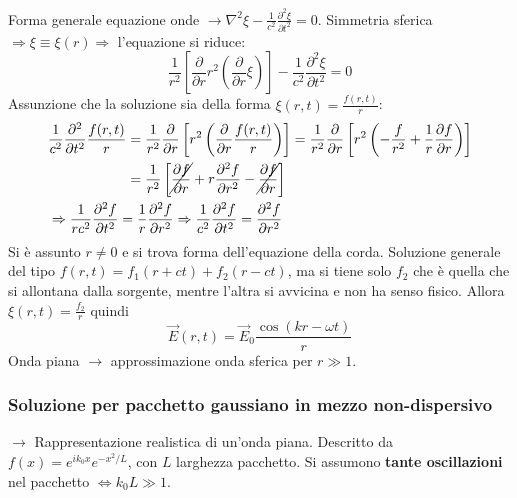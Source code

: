 \documentclass[a4paper]{scrartcl}
\numberwithin{equation}{subsection}
\theoremstyle{style1}
\begin{document}
Forma generale equazione onde $\to \nabla ^2 \xi  - \frac{1}{c^2} \frac{\partial ^2 \xi }{\partial t^2} = 0$. Simmetria sferica $\Rightarrow \xi \equiv \xi (r)\Rightarrow $ l'equazione si riduce:
\begin{equation}
	\frac{1}{r^2}\left[ \frac{\partial }{\partial r} r^2 \left(\frac{\partial }{\partial r} \xi \right)  \right]  -\frac{1}{c^2}\frac{\partial ^2\xi }{\partial t^2} =0
\end{equation}
Assunzione che la soluzione sia della forma $\xi (r,t) = \frac{f(r,t)}{r}$:
\begin{equation}
\begin{split}
	&\begin{split}
		\frac{1}{c^2}\frac{\partial ^2}{\partial t^2} \frac{f(r,t)}{r}&= \frac{1}{r^2}\frac{\partial }{\partial r} \left[ r^2 \left(\frac{\partial }{\partial r} \frac{f(r,t)}{r}\right)  \right] = \frac{1}{r^2 }\frac{\partial }{\partial r} \left[ r^2\left(-\frac{f}{r^2}+ \frac{1}{r}\frac{\partial f}{\partial r} \right)  \right] \\
									      &=\frac{1}{r^2}\left[ \cancel{\frac{\partial f}{\partial r} } + r \frac{\partial ^2 f}{\partial r^2} -\cancel{\frac{\partial f}{\partial r} } \right] 
	\end{split}\\
	&\Rightarrow \frac{1}{rc^2}\frac{\partial ^2f}{\partial t^2} = \frac{1}{r}\frac{\partial ^2 f}{\partial r^2} \Rightarrow \frac{1}{c^2}\frac{\partial ^2 f}{\partial t^2} = \frac{\partial ^2 f}{\partial r^2}
\end{split}
\end{equation}
Si \`e assunto $r\neq 0$ e si trova forma dell'equazione della corda. Soluzione generale del tipo $f(r,t) = f_1(r+ct) + f_2(r-ct)$, ma si tiene solo $f_2$ che \`e quella che si allontana dalla sorgente, mentre l'altra si avvicina e non ha senso fisico. Allora $\xi (r,t) = \frac{f_2}{r}$ quindi
\begin{equation}
	\vec{E}(r,t) = \vec{E}_0 \frac{\cos(kr - \omega t)}{r}
\end{equation}
Onda piana $\to$ approssimazione onda sferica per $r\gg 1$.

\subsubsection{Soluzione per pacchetto gaussiano in mezzo non-dispersivo}

$\to$ Rappresentazione realistica di un'onda piana. Descritto da $f(x) = e^{ik_0 x } e^{-x^2 / L} $, con $L$ larghezza pacchetto. Si assumono \textbf{tante oscillazioni} nel pacchetto $\iff k_0 L \gg 1$.
\end{document}
